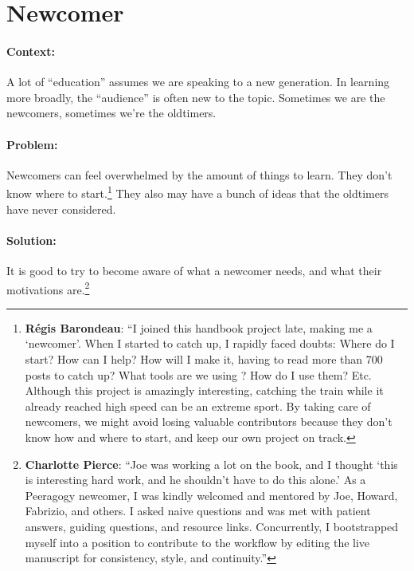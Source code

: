 \section{Newcomer}
\paragraph{Context:}
A lot of ``education'' assumes we are speaking to a new generation. 
In learning more broadly, the ``audience'' is often new to the topic.
Sometimes we are the newcomers, sometimes we're the oldtimers.

\paragraph{Problem:} Newcomers can feel overwhelmed by the amount of things to learn.  They
don't know where to start.\footnote{\textbf{R\'egis Barondeau}: ``I joined this handbook project late, making me
a `newcomer'. When I started to catch up, I rapidly faced doubts:
Where do I start? How can I help? How will I make it, having to read
more than 700 posts to catch up? What tools are we using ? How do I use
them? Etc. Although this project is amazingly interesting, catching the
train while it already reached high speed can be an extreme sport. By
taking care of newcomers, we might avoid losing valuable contributors
because they don't know how and where to start, and keep our own project
on track.}  They also may have a bunch of ideas that the oldtimers have
never considered.

\paragraph{Solution:} It is good to try to become aware of what a newcomer
needs, and what their motivations are.\footnote{\textbf{Charlotte Pierce}: ``Joe was working
a lot on the book, and I thought `this is interesting hard work, and he shouldn't have to do
this alone.' As a Peeragogy newcomer, I was kindly welcomed and
mentored by Joe, Howard, Fabrizio, and others. I asked naive questions
and was met with patient answers, guiding questions, and resource links.
Concurrently, I bootstrapped myself into a position to contribute to the
workflow by editing the live manuscript for consistency, style, and continuity.''}


